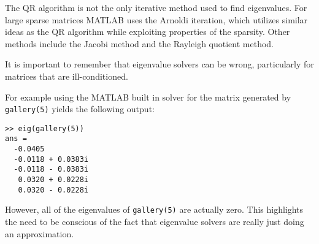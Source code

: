 The QR algorithm is not the only iterative method used to find eigenvalues. For large sparse matrices MATLAB uses the Arnoldi iteration, which utilizes similar ideas as the QR algorithm while exploiting properties of the sparsity. Other methods include the Jacobi method and the Rayleigh quotient method.

It is important to remember that eigenvalue solvers can be wrong, particularly for matrices that are ill-conditioned. 
\begin{matlab}
For example using the MATLAB built in solver for the matrix generated by {\tt gallery(5)} yields the following output:
\begin{lstlisting}[style=matlab]
>> eig(gallery(5))
ans =
  -0.0405          
  -0.0118 + 0.0383i
  -0.0118 - 0.0383i
   0.0320 + 0.0228i
   0.0320 - 0.0228i
\end{lstlisting}

However, all of the eigenvalues of {\tt gallery(5)} are actually zero. This highlights the need to be conscious of the fact that eigenvalue solvers are really just doing an approximation.
\end{matlab}